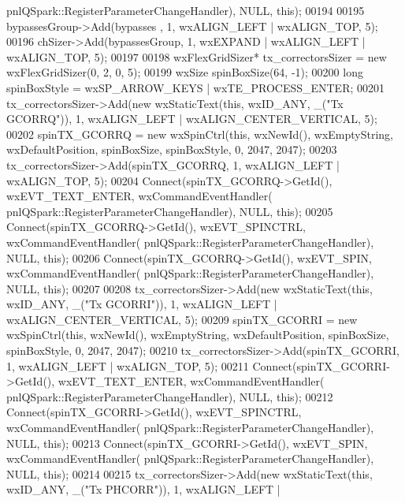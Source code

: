 \begin{DoxyCode}
      pnlQSpark::RegisterParameterChangeHandler), NULL, \textcolor{keyword}{this});
00194 
00195     bypassesGroup->Add(bypasses , 1, wxALIGN\_LEFT | wxALIGN\_TOP, 5);
00196     chSizer->Add(bypassesGroup, 1, wxEXPAND | wxALIGN\_LEFT | wxALIGN\_TOP, 5);
00197 
00198     wxFlexGridSizer* tx\_correctorsSizer = \textcolor{keyword}{new} wxFlexGridSizer(0, 2, 0, 5);
00199     wxSize spinBoxSize(64, -1);
00200     \textcolor{keywordtype}{long} spinBoxStyle = wxSP\_ARROW\_KEYS | wxTE\_PROCESS\_ENTER;
00201     tx\_correctorsSizer->Add(\textcolor{keyword}{new} wxStaticText(\textcolor{keyword}{this}, wxID\_ANY, \_(\textcolor{stringliteral}{"Tx GCORRQ"})), 1, wxALIGN\_LEFT | 
      wxALIGN\_CENTER\_VERTICAL, 5);
00202     spinTX_GCORRQ = \textcolor{keyword}{new} wxSpinCtrl(\textcolor{keyword}{this}, wxNewId(), wxEmptyString, wxDefaultPosition, spinBoxSize, 
      spinBoxStyle, 0, 2047, 2047);
00203     tx\_correctorsSizer->Add(spinTX_GCORRQ, 1, wxALIGN\_LEFT | wxALIGN\_TOP, 5);
00204     Connect(spinTX_GCORRQ->GetId(), wxEVT\_TEXT\_ENTER, wxCommandEventHandler(
      pnlQSpark::RegisterParameterChangeHandler), NULL, \textcolor{keyword}{this});
00205     Connect(spinTX_GCORRQ->GetId(), wxEVT\_SPINCTRL, wxCommandEventHandler(
      pnlQSpark::RegisterParameterChangeHandler), NULL, \textcolor{keyword}{this});
00206     Connect(spinTX_GCORRQ->GetId(), wxEVT\_SPIN, wxCommandEventHandler(
      pnlQSpark::RegisterParameterChangeHandler), NULL, \textcolor{keyword}{this});
00207 
00208     tx\_correctorsSizer->Add(\textcolor{keyword}{new} wxStaticText(\textcolor{keyword}{this}, wxID\_ANY, \_(\textcolor{stringliteral}{"Tx GCORRI"})), 1, wxALIGN\_LEFT | 
      wxALIGN\_CENTER\_VERTICAL, 5);
00209     spinTX_GCORRI = \textcolor{keyword}{new} wxSpinCtrl(\textcolor{keyword}{this}, wxNewId(), wxEmptyString, wxDefaultPosition, spinBoxSize, 
      spinBoxStyle, 0, 2047, 2047);
00210     tx\_correctorsSizer->Add(spinTX_GCORRI, 1, wxALIGN\_LEFT | wxALIGN\_TOP, 5);
00211     Connect(spinTX_GCORRI->GetId(), wxEVT\_TEXT\_ENTER, wxCommandEventHandler(
      pnlQSpark::RegisterParameterChangeHandler), NULL, \textcolor{keyword}{this});
00212     Connect(spinTX_GCORRI->GetId(), wxEVT\_SPINCTRL, wxCommandEventHandler(
      pnlQSpark::RegisterParameterChangeHandler), NULL, \textcolor{keyword}{this});
00213     Connect(spinTX_GCORRI->GetId(), wxEVT\_SPIN, wxCommandEventHandler(
      pnlQSpark::RegisterParameterChangeHandler), NULL, \textcolor{keyword}{this});
00214 
00215     tx\_correctorsSizer->Add(\textcolor{keyword}{new} wxStaticText(\textcolor{keyword}{this}, wxID\_ANY, \_(\textcolor{stringliteral}{"Tx PHCORR"})), 1, wxALIGN\_LEFT | 

\end{DoxyCode}
